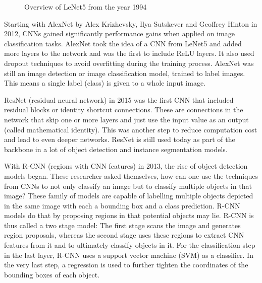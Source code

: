 \begin{figure}[!h]
	\caption{\label{fig:lenet5} Overview of LeNet5 from the year 1994}
\end{figure}

Starting with AlexNet by Alex Krizhevsky, Ilya Sutskever and Geoffrey Hinton in 2012, CNNs gained significantly performance gains when applied on image classification tasks. AlexNet took the idea of a CNN from LeNet5 and added more layers to the network and was the first to include ReLU layers. It also used dropout techniques to avoid overfitting during the training process. AlexNet was still an image detection or image classification model, trained to label images. This means a single label (class) is given to a whole input image.

ResNet (residual neural network) in 2015 was the first CNN that included residual blocks or identity shortcut connections. These are connections in the network that skip one or more layers and just use the input value as an output (called mathematical identity). This was another step to reduce computation cost and lead to even deeper networks. ResNet is still used today as part of the backbone in a lot of object detection and instance segmentation models.

With R-CNN (regions with CNN features) in 2013, the rise of object detection models began. These researcher asked themselves, how can one use the techniques from CNNs to not only classify an image but to classify multiple objects in that image?  These family of models are capable of labelling multiple objects depicted in the same image with each a bounding box and a class prediction. R-CNN models do that by proposing regions in that potential objects may lie. R-CNN is thus called a two stage model: The first stage scans the image and generates region proposals, whereas the second stage uses these regions to extract CNN features from it and to ultimately classify objects in it. For the classification step in the last layer, R-CNN uses a support vector machine (SVM) as a classifier. In the very last step, a regression is used to further tighten the coordinates of the bounding boxes of each object. \cite{R-CNN}

